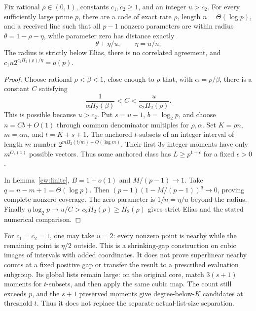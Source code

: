 \begin{theorem}
\label{cw:punctured-line}
Fix rational $\rho\in(0,1)$, constants $c_1,c_2\ge1$, and an integer
$u>c_2$. For every sufficiently large prime $p$, there are a code of
exact rate $\rho$, length $n=\Theta(\log p)$, and a received line
such that all $p-1$ nonzero parameters are within radius
$\theta=1-\rho-\eta$, while parameter zero has distance exactly
\[
 \theta+\eta/u,\qquad \eta=u/n.
\]
The radius is strictly below Elias, there is no correlated agreement,
and $c_1n2^{c_2H_2(\rho)/\eta}=o(p)$.
\end{theorem}
\begin{proof}
Choose rational $\rho<\beta<1$, close enough to $\rho$ that, with
$\alpha=\rho/\beta$, there is a constant $C$ satisfying
\[
 \frac1{\alpha H_2(\beta)}<C<\frac u{c_2H_2(\rho)}.
\]
This is possible because $u>c_2$. Put $s=u-1$, $b=\log_2p$,
and choose $n=Cb+O(1)$ through common denominator multiples for
$\rho,\alpha$. Set $K=\rho n$, $m=\alpha n$, and $t=K+s+1$.
The anchored $t$-subsets of an integer interval of length $m$ number
$2^{mH_2(t/m)-O(\log m)}$. Their first $3s$ integer moments have
only $m^{O_s(1)}$ possible vectors. Thus some anchored class has
$L\ge p^{1+\epsilon}$ for a fixed $\epsilon>0$.

In Lemma~\ref{cw:finite}, $B=1+o(1)$ and $M/(p-1)\to1$.
Take $q=n-m+1=\Theta(\log p)$. Then
$(p-1)(1-M/(p-1))^q\to0$, proving complete nonzero coverage.
The zero parameter is $1/n=\eta/u$ beyond the radius.
Finally $\eta\log_2p\to u/C>c_2H_2(\rho)\ge H_2(\rho)$ gives strict
Elias and the stated numerical comparison.
\end{proof}

For $c_1=c_2=1$, one may take $u=2$: every nonzero point is nearby
while the remaining point is $\eta/2$ outside. This is a shrinking-gap
construction on cubic images of intervals with added coordinates.
It does not prove superlinear nearby counts at a fixed positive gap
or transfer the result to a prescribed evaluation subgroup.
Its global lists remain large: on the original core, match $3(s+1)$
moments for $t$-subsets, and then apply the same cubic map. The count
still exceeds $p$, and the $s+1$ preserved moments give degree-below-$K$
candidates at threshold $t$. Thus it does not replace the separate
actual-list-size separation.
